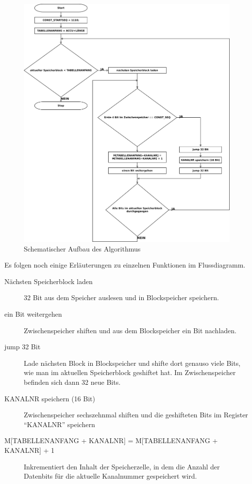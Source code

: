 \begin{figure}[htb]
    \centering
    \includegraphics[width=\textwidth]{pflichtenheft/res/algorithmus.pdf}
    \caption{Schematischer Aufbau des Algorithmus}
    \label{figure:Pflichtenheft-SystemtechnischeLoesung-Loesungsansatz-Algorithmus}
\end{figure}

\clearpage

Es folgen noch einige Erläuterungen zu einzelnen Funktionen im Flussdiagramm.

\begin{description}
    \item[{Nächsten Speicherblock laden}] 32 Bit aus dem Speicher auslesen und in Blockspeicher speichern.
    
    \item[{ein Bit weitergehen}] Zwischenspeicher shiften und aus dem Blockspeicher ein Bit nachladen.
    
    \item[{jump 32 Bit}] Lade nächsten Block in Blockspeicher und shifte dort genauso viele Bits, wie man im aktuellen Speicherblock geshiftet hat. Im Zwischenspeicher befinden sich dann 32 neue Bits.
    
    \item[{KANALNR speichern (16 Bit)}] Zwischenspeicher sechszehnmal shiften und die geshifteten Bits im Register "`KANALNR"' speichern
    
    \item[{M[TABELLENANFANG + KANALNR] = M[TABELLENANFANG + KANALNR] + 1}] Inkrementiert den Inhalt der Speicherzelle, in dem die Anzahl der Datenbits für die aktuelle Kanalnummer gespeichert wird.
\end{description}


